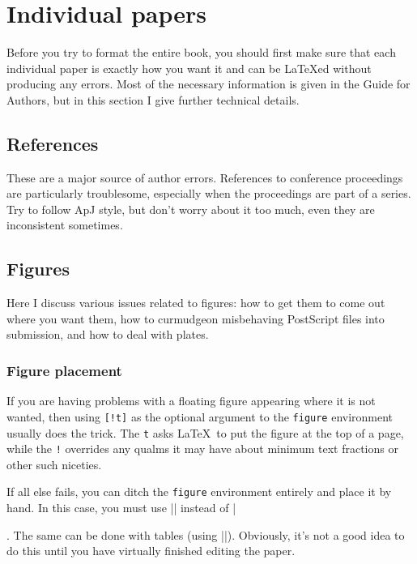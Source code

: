 \documentclass[guide]{rmaa}
\begin{document}
\section{Individual papers}
\label{sec:individual-papers}

Before you try to format the entire book, you should first make sure
that each individual paper is exactly how you want it and can be
\LaTeX ed without producing any errors.  Most of the necessary
information is given in the Guide for Authors, but in this section I
give further technical details.

\subsection{References}
\label{sec:references}

These are a major source of author errors. References to conference
proceedings are particularly troublesome, especially when the
proceedings are part of a series. Try to follow ApJ style, but don't
worry about it too much, even they are inconsistent sometimes.

\subsection{Figures}
\label{sec:figures}

Here I discuss various issues related to figures: how to get them to
come out where you want them, how to curmudgeon misbehaving PostScript
files into submission, and how to deal with plates.

\subsubsection{Figure placement}
\label{sec:figure-placement}

If you are having problems with a floating figure appearing where it
is not wanted, then using \texttt{[!t]} as the optional argument to
the \texttt{figure} environment usually does the trick. The \texttt{t}
asks \LaTeX\ to put the figure at the top of a page, while the
\texttt{!} overrides any qualms it may have about minimum text
fractions or other such niceties.

If all else fails, you can ditch the \texttt{figure} environment
entirely and place it by hand. In this case, you must use
|\figcaption| instead of |\caption|. The same can be done with tables
(using |\tabcaption|). Obviously, it's not a good idea to do this
until you have virtually finished editing the paper. 
\end{document}

